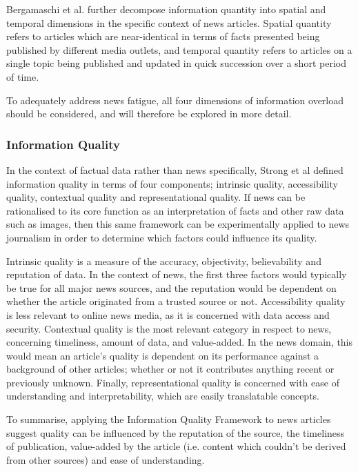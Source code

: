 Bergamaschi et al.\citep{GuestEditorsIntroductionInformationOverload} further decompose information quantity into spatial and temporal dimensions in the specific context of news articles. Spatial quantity refers to articles which are near-identical in terms of facts presented being published by different media outlets, and temporal quantity refers to articles on a single topic being published and updated in quick succession over a short period of time.

To adequately address news fatigue, all four dimensions of information overload should be considered, and will therefore be explored in more detail.

\subsubsection{Information Quality}
In the context of factual data rather than news specifically, Strong et al \citep{DataQualityInContext} defined information quality in terms of four components; intrinsic quality, accessibility quality, contextual quality and representational quality. If news can be rationalised to its core function as an interpretation of facts and other raw data such as images, then this same framework can be experimentally applied to news journalism in order to determine which factors could influence its quality.

Intrinsic quality is a measure of the accuracy, objectivity, believability and reputation of data. In the context of news, the first three factors would typically be true for all major news sources, and the reputation would be dependent on whether the article originated from a trusted source or not. Accessibility quality is less relevant to online news media, as it is concerned with data access and security. Contextual quality is the most relevant category in respect to news, concerning timeliness, amount of data, and value-added. In the news domain, this would mean an article's quality is dependent on its performance against a background of other articles; whether or not it contributes anything recent or previously unknown. Finally, representational quality is concerned with ease of understanding and interpretability, which are easily translatable concepts.

To summarise, applying the Information Quality Framework\citep{DataQualityInContext} to news articles suggest quality can be influenced by the reputation of the source, the timeliness of publication, value-added by the article (i.e. content which couldn't be derived from other sources) and ease of understanding.

